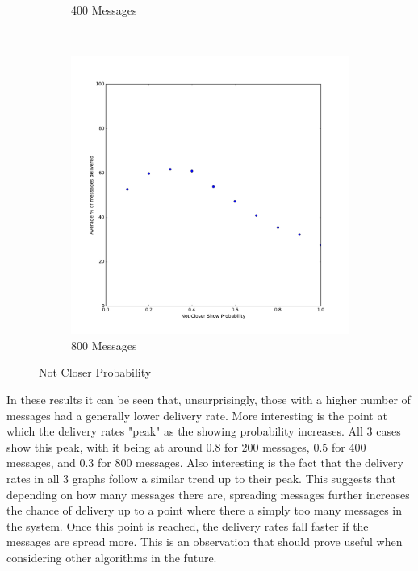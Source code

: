 \documentclass[bsc,frontabs,twoside,singlespacing,parskip,deptreport]{infthesis}     %
\begin{document}
\begin{figure}[h]
\begin{subfigure}[b]{0.3\textwidth}
        \caption{400 Messages}
        \label{fig:results/notCloserProb_400messages}
    \end{subfigure}
    ~ %
    \begin{subfigure}[b]{0.3\textwidth}
        \includegraphics[width=\textwidth]{results/notCloserProb_800messages}
        \caption{800 Messages}
        \label{fig:results/notCloserProb_800messages}
    \end{subfigure}
  	\vspace{-5pt}
    \caption{Not Closer Probability}\label{fig:NotCloserProbability}
  	\vspace{-5pt}
\end{figure}

In these results it can be seen that, unsurprisingly, those with a higher number of messages had a generally lower delivery rate. More interesting is the point at which the delivery rates "peak" as the showing probability increases. All 3 cases show this peak, with it being at around 0.8 for 200 messages, 0.5 for 400 messages, and 0.3 for 800 messages. Also interesting is the fact that the delivery rates in all 3 graphs follow a similar trend up to their peak. This suggests that depending on how many messages there are, spreading messages further increases the chance of delivery up to a point where there a simply too many messages in the system. Once this point is reached, the delivery rates fall faster if the messages are spread more. This is an observation that should prove useful when considering other algorithms in the future.
\end{document}
